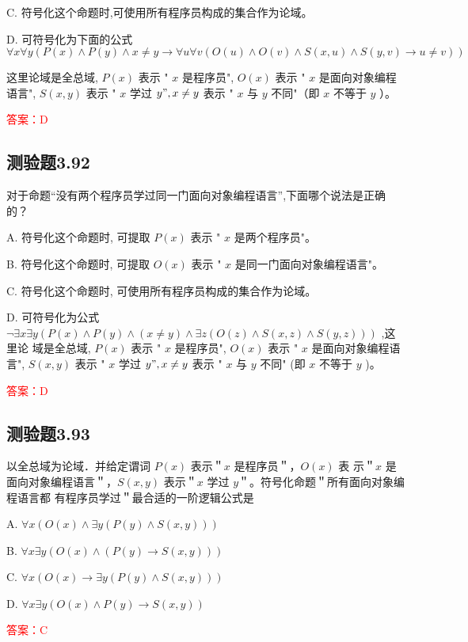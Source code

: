 \documentclass[UTF8, heading=true]{ctexart}
\begin{document}
C. 符号化这个命题时,可使用所有程序员构成的集合作为论域。

D. 
可符号化为下面的公式
$$
\forall x \forall y(P(x) \wedge P(y) \wedge x \neq y \rightarrow \forall u \forall v(O(u) \wedge O(v) \wedge S(x, u) \wedge S(y, v) \rightarrow u \neq v))
$$

这里论域是全总域, $P(x)$ 表示 " $x$ 是程序员", $O(x)$ 表示 " $x$ 是面向对象编程语言", $S(x, y)$ 表示 " $x$ 学过 $y ", x \neq y$ 表示 " $x$ 与 $y$ 不同"（即 $x$ 不等于 $y$ ）。


\textcolor{red}{答案：D}

\subsection{测验题3.92}

对于命题“没有两个程序员学过同一门面向对象编程语言”,下面哪个说法是正确的？

A. 符号化这个命题时, 可提取 $P(x)$ 表示 " $x$ 是两个程序员"。

B. 符号化这个命题时, 可提取 $O(x)$ 表示 " $x$ 是同一门面向对象编程语言"。

C. 符号化这个命题时, 可使用所有程序员构成的集合作为论域。

D. 可符号化为公式 $\neg \exists x \exists y(P(x) \wedge P(y) \wedge(x \neq y) \wedge \exists z(O(z) \wedge S(x, z) \wedge S(y, z)))$ ,这里论
域是全总域, $P(x)$ 表示 " $x$ 是程序员", $O(x)$ 表示 " $x$ 是面向对象编程语言", $S(x, y)$ 表示 " $x$ 学过 $y ", x \neq y$ 表示 " $x$ 与 $y$ 不同" (即 $x$ 不等于 $y$ )。

\textcolor{red}{答案：D}

\subsection{测验题3.93}

以全总域为论域．并给定谓词 $P(x)$ 表示＂$x$ 是程序员＂，$O(x)$ 表
示＂$x$ 是面向对象编程语言＂，$S(x, y)$ 表示＂$x$ 学过 $y$＂。符号化命题＂所有面向对象编程语言都
有程序员学过＂最合适的一阶逻辑公式是 $\qquad$

A. $\forall x(O(x) \wedge \exists y(P(y) \wedge S(x, y)))$

B. $\forall x \exists y(O(x) \wedge(P(y) \rightarrow S(x, y)))$

C. $\forall x(O(x) \rightarrow \exists y(P(y) \wedge S(x, y)))$

D. $\forall x \exists y(O(x) \wedge P(y) \rightarrow S(x, y))$

\textcolor{red}{答案：C}
\end{document}
